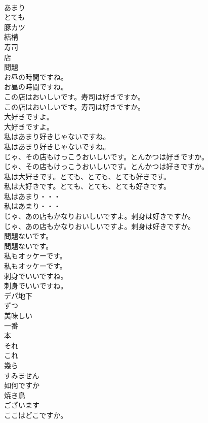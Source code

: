 \documentclass[8pt]{extreport}
\begin{document}
\begin{CJK}{UTF8}{min}
\\	あまり
\\	とても
\\	豚カツ
\\	結構
\\	寿司
\\	店
\\	問題
\\	お昼の時間ですね。	
\\	お昼の時間ですね。 
\\	この店はおいしいです。寿司は好きですか。	
\\	この店はおいしいです。寿司は好きですか。 
\\	大好きですよ。	
\\	大好きですよ。 
\\	私はあまり好きじゃないですね。	
\\	私はあまり好きじゃないですね。 
\\	じゃ、その店もけっこうおいしいです。とんかつは好きですか。	
\\	じゃ、その店もけっこうおいしいです。とんかつは好きですか。 
\\	私は大好きです。とても、とても、とても好きです。	
\\	私は大好きです。とても、とても、とても好きです。 
\\	私はあまり・・・	
\\	私はあまり・・・ 
\\	じゃ、あの店もかなりおいしいですよ。刺身は好きですか。	
\\	じゃ、あの店もかなりおいしいですよ。刺身は好きですか。 
\\	問題ないです。	
\\	問題ないです。 
\\	私もオッケーです。	
\\	私もオッケーです。 
\\	刺身でいいですね。	
\\	刺身でいいですね。 
\\	デパ地下
\\	ずつ
\\	美味しい
\\	一番
\\	本
\\	それ
\\	これ
\\	幾ら
\\	すみません
\\	如何ですか
\\	焼き鳥
\\	ございます
\\	ここはどこですか。	

\end{CJK}
\end{document}
